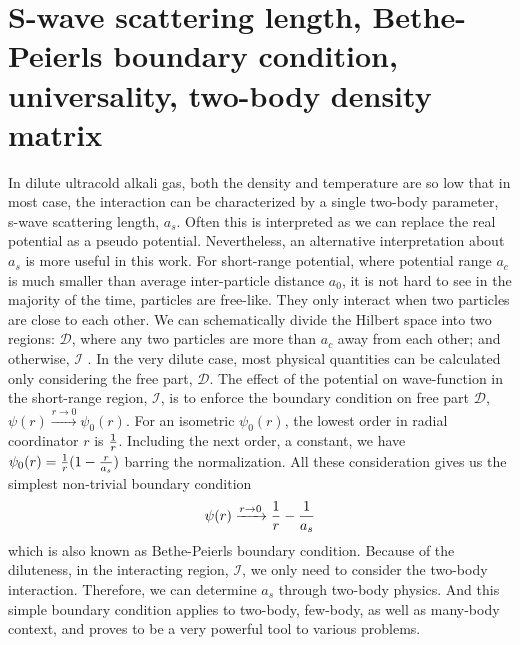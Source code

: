 \section{S-wave scattering length, Bethe-Peierls boundary condition, universality, two-body density matrix\label{sec:intro:as}}
In dilute ultracold alkali gas, both the density and temperature are so low that in most case, the interaction can be characterized by a single two-body parameter, s-wave scattering length, $a_s$.  Often this is  interpreted as we can replace the real potential as a pseudo potential\cite{pethick}.  Nevertheless, an alternative interpretation about $a_s$ is more useful in this work\cite{LeggettBEC, Tan2008-1,Tan2008-2,CombescotTan}.  For short-range potential, where potential range $a_c$ is much smaller than average inter-particle distance $a_0$, it is not hard to see in the majority of the time, particles are free-like.  They only interact  when two particles are close to each other.  We can schematically divide the Hilbert space into two regions: $\mathcal{D}$, where any two particles are more than $a_c$ away from each other; and otherwise, $\mathcal{I}$ .  In the very dilute case, most physical quantities can be calculated only considering the free part, $\mathcal{D}$.  The effect of the potential on wave-function in the short-range region, $\mathcal{I}$, is to enforce the boundary condition on free part $\mathcal{D}$, $\psi(r)\xrightarrow{r\to0}\psi_{0}(r)$.  For an isometric $\psi_{0}(r)$, the lowest order in radial coordinator $r$ is $\frac{1}{r}$.   Including the next order, a constant,  we have $\psi_{0}(r)=\frac{1}{r}(1-\frac{r}{a_{s}})$ barring the normalization.  All these consideration gives us the simplest non-trivial boundary condition
\begin{equation}\label{eq:intro:Bethe}
\psi(r)\xrightarrow{r\to0}\frac{1}{r}-\frac{1}{a_s}
\end{equation}
which is also known as Bethe-Peierls boundary condition\cite{BethePeierls}.  Because of the diluteness, in the interacting region, $\mathcal{I}$, we only need to consider the two-body interaction.  Therefore, we can determine $a_{s}$ through two-body physics.  And   this simple boundary condition applies to two-body, few-body, as well as many-body context, and proves to be a very powerful tool to various problems.  

